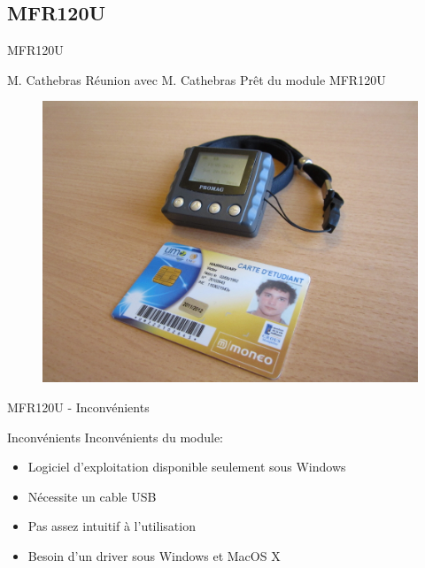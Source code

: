 \subsection{MFR120U}
\begin{frame}{MFR120U}
	\begin{block}{M. Cathebras}
        Réunion avec M. Cathebras
        Prêt du module MFR120U
	\end{block}

    \begin{figure}[h]
        \begin{center}
            \includegraphics[scale=0.4]{images/mfr.jpg} 
        \end{center}
     \end{figure} 
\end{frame}


\begin{frame}{MFR120U - Inconvénients}
	\begin{block}{Inconvénients}
        Inconvénients du module:

	    \begin{itemize}
            \item Logiciel d'exploitation disponible seulement sous Windows
            \item Nécessite un cable USB
            \item Pas assez intuitif à l'utilisation
            \item Besoin d'un driver sous Windows et MacOS X
	    \end{itemize}
	\end{block}
\end{frame}


